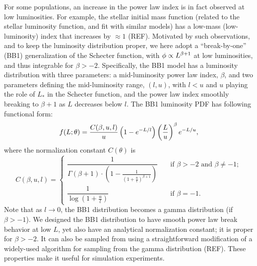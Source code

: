 
For some populations, an increase in the power law index is in fact observed at low luminosities.
For example, the stellar initial mass function (related to the stellar luminosity function, and fit with similar models) has a low-mass (low-luminosity) index that increases by $\approx 1$ (REF).
Motivated by such observations, and to keep the luminosity distribution proper, we here adopt a ``break-by-one'' (BB1) generalization of the Schecter function, with $\phi \propto L^{\beta+1}$ at low luminosities, and thus integrable for $\beta > -2$.
Specifically, the BB1 model has a luminosity distribution with three parameters: a mid-luminosity power law index, $\beta$, and two parameters defining the mid-luminosity range, $(l, u)$, with $l < u$ and  $u$ playing the role of $L_*$ in the Schecter function, and the power law index smoothly breaking to $\beta+1$ as $L$ decreases below $l$.
The BB1 luminosity PDF has following functional form:
\begin{equation}
\label{eq:lumPDF} 
f(L ; \theta) = 
  \frac{C(\beta,u,l)}{u}\left(1-e^{-L/l}\right) \left(\frac{L}{u}\right)^{\beta} e^{-L/u},
\end{equation}
where the normalization constant $C(\theta)$ is
\begin{equation}
\label{eq:normLumPDF} 
C(\beta,u,l) =
  \begin{cases} \dfrac{1}{\Gamma(\beta+1)\cdot\left(1-\frac{1}{\left(1+\frac{u}{l}\right)^{\beta+1}}\right)} 
    & \quad \text{if } \beta > -2\text{ and }\beta \ne -1; \\
 \dfrac{1}{\log\left(1+\frac{u}{l}\right)} & \quad \text{if } \beta=-1.
  \end{cases}
\end{equation} 
Note that as $l\rightarrow 0$, the BB1 distribution becomes a gamma distribution (if $\beta > -1$).
We designed the BB1 distribution to have smooth power law break behavior at low $L$, yet also have an analytical normalization constant;
it is proper for $\beta > -2$.
It can also be sampled from using a straightforward modification of a widely-used algorithm for sampling from the gamma distribution (REF).
These properties make it useful for simulation experiments.


